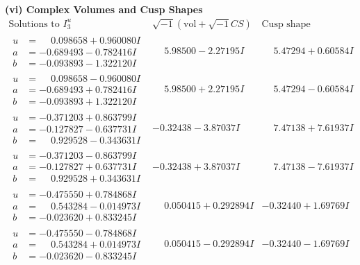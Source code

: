 \documentclass[1p]{elsarticle_modified}
\theoremstyle{definition}
\newcommand{\I}{\sqrt{-1}}
\begin{document}
\newpage\flushleft \textbf{(vi) Complex Volumes and Cusp Shapes}
$$\begin{array}{c|c|c}  
\text{Solutions to }I^u_{3}& \I (\text{vol} + \sqrt{-1}CS) & \text{Cusp shape}\\
 \hline 
\begin{aligned}
u &= \phantom{-}0.098658 + 0.960080 I \\
a &= -0.689493 - 0.782416 I \\
b &= -0.093893 - 1.322120 I\end{aligned}
 & \phantom{-}5.98500 - 2.27195 I & \phantom{-}5.47294 + 0.60584 I \\ \hline\begin{aligned}
u &= \phantom{-}0.098658 - 0.960080 I \\
a &= -0.689493 + 0.782416 I \\
b &= -0.093893 + 1.322120 I\end{aligned}
 & \phantom{-}5.98500 + 2.27195 I & \phantom{-}5.47294 - 0.60584 I \\ \hline\begin{aligned}
u &= -0.371203 + 0.863799 I \\
a &= -0.127827 - 0.637731 I \\
b &= \phantom{-}0.929528 - 0.343631 I\end{aligned}
 & -0.32438 - 3.87037 I & \phantom{-}7.47138 + 7.61937 I \\ \hline\begin{aligned}
u &= -0.371203 - 0.863799 I \\
a &= -0.127827 + 0.637731 I \\
b &= \phantom{-}0.929528 + 0.343631 I\end{aligned}
 & -0.32438 + 3.87037 I & \phantom{-}7.47138 - 7.61937 I \\ \hline\begin{aligned}
u &= -0.475550 + 0.784868 I \\
a &= \phantom{-}0.543284 - 0.014973 I \\
b &= -0.023620 + 0.833245 I\end{aligned}
 & \phantom{-}0.050415 + 0.292894 I & -0.32440 + 1.69769 I \\ \hline\begin{aligned}
u &= -0.475550 - 0.784868 I \\
a &= \phantom{-}0.543284 + 0.014973 I \\
b &= -0.023620 - 0.833245 I\end{aligned}
 & \phantom{-}0.050415 - 0.292894 I & -0.32440 - 1.69769 I \\ \hline\begin{aligned}

\end{aligned}
\end{array}$$
\end{document}
